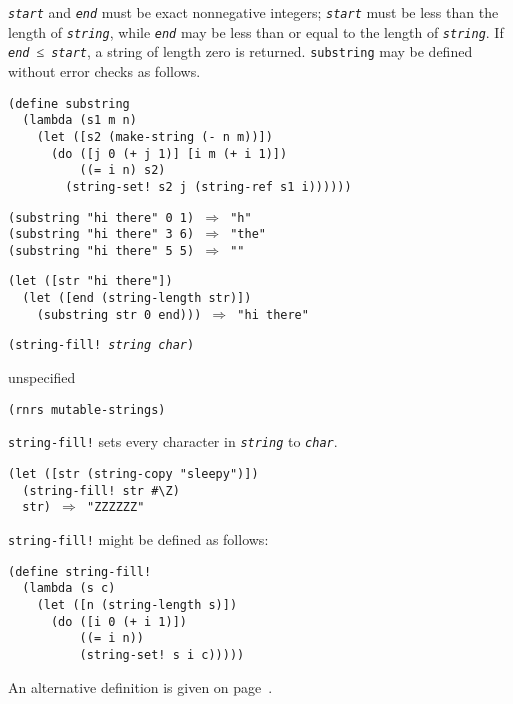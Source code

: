 \texttt{\textit{start}} and \texttt{\textit{end}} must be exact nonnegative integers;
\texttt{\textit{start}} must be less than the length of \texttt{\textit{string}},
while \texttt{\textit{end}} may be less than or equal to the length of
\texttt{\textit{string}}.
If \texttt{\textit{end}} ≤ \texttt{\textit{start}}, a string of length zero is returned.
\texttt{substring} may be defined without error checks as follows.

\begin{alltt}
(define substring
  (lambda (s1 m n)
    (let ([s2 (make-string (- n m))])
      (do ([j 0 (+ j 1)] [i m (+ i 1)])
          ((= i n) s2)
        (string-set! s2 j (string-ref s1 i))))))

(substring "hi there" 0 1) \(\Rightarrow\) "h"
(substring "hi there" 3 6) \(\Rightarrow\) "the"
(substring "hi there" 5 5) \(\Rightarrow\) ""

(let ([str "hi there"])
  (let ([end (string-length str)])
    (substring str 0 end))) \(\Rightarrow\) "hi there"
\end{alltt}

\begin{description}

\label{objects_s225}\item[procedure] \texttt{(string-fill! \textit{string} \textit{char})}



\item[returns] unspecified


\item[libraries] \texttt{(rnrs mutable-strings)}
\end{description}

\texttt{string-fill!} sets every character in \texttt{\textit{string}} to \texttt{\textit{char}}.

\begin{alltt}
(let ([str (string-copy "sleepy")])
  (string-fill! str \#{}\textbackslash{}Z)
  str) \(\Rightarrow\) "ZZZZZZ"
\end{alltt}

\texttt{string-fill!} might be defined as follows:

\begin{alltt}
(define string-fill!
  (lambda (s c)
    (let ([n (string-length s)])
      (do ([i 0 (+ i 1)])
          ((= i n))
          (string-set! s i c)))))
\end{alltt}


An alternative definition is given on page \pageref{io_backdoor_string_fill}.


